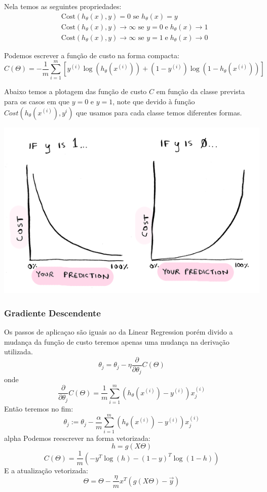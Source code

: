 \documentclass[11pt,a4paper,leqno]{article}
\begin{document}
Nela temos as seguintes propriedades:
\begin{align*}
	& \mathrm{Cost}(h_\theta(x),y) = 0 \text{ se } h_\theta(x) = y \\
	& \mathrm{Cost}(h_\theta(x),y) \rightarrow \infty \text{ se } y = 0 \; \mathrm{e} \; h_\theta(x) \rightarrow 1 \\
	& \mathrm{Cost}(h_\theta(x),y) \rightarrow \infty \text{ se } y = 1 \; \mathrm{e} \; h_\theta(x) \rightarrow 0
\end{align*}

Podemos escrever a função de custo na forma compacta:
\[
C(\Theta) = - \frac{1}{m} \displaystyle \sum_{i=1}^m [y^{(i)} \log(h_\theta(x^{(i)})) + (1 - y^{(i)}) \log(1 - h_\theta(x^{(i)}))]
\]

Abaixo temos a plotagem das função de custo $C$ em função da classe prevista para os casos em que $y = 0$ e $y = 1$, note que devido à função $Cost(h_\theta(x^{(i)}), y^{i})$ que usamos para cada classe temos diferentes formas.

\includegraphics[scale=0.5]{Images/logistic_regression_plot_cost_function.png} 


\subsubsection{Gradiente Descendente}
Os passos de aplicaçao são iguais ao da Linear Regression porém divido a mudança da função de custo teremos apenas uma mudança na derivação utilizada.
\[
\theta_j = \theta_j - \eta \frac{\partial}{\partial \theta_j} C(\Theta)
\]
onde
\[
\frac{\partial}{\partial \theta_j} C(\Theta) = \frac{1}{m} \sum_{i=1}^m (h_\theta(x^{(i)}) - y^{(i)}) x_j^{(i)}
\]
Então teremos no fim:
\[
\theta_j := \theta_j - \frac{\alpha}{m} \sum_{i=1}^m (h_\theta(x^{(i)}) - y^{(i)}) x_j^{(i)}
\]
alpha
Podemos reescrever na forma vetorizada:
\[ h = g(X \Theta) \]
\[
C(\Theta) = \frac{1}{m} (-y^T \log(h) - (1 - y)^T \log(1 - h))
\]
E a atualização vetorizada:
\[
\Theta = \Theta - \frac{\eta}{m} x^T (g(X\Theta) - \vec{y})
\]
	
\end{document}
